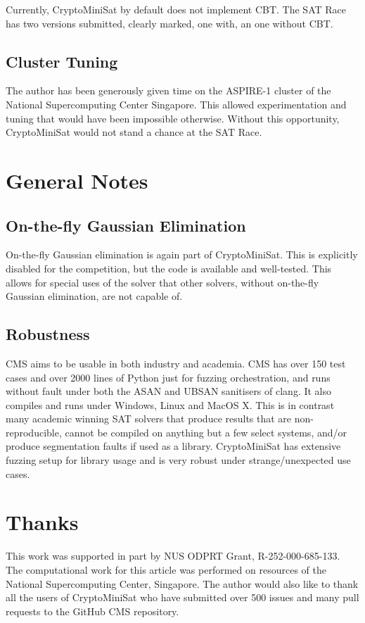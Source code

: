 \documentclass[final]{ieee}
\begin{document}
Currently, CryptoMiniSat by default does not implement CBT. The SAT Race has two versions submitted, clearly marked, one with, an one without CBT.

\subsection{Cluster Tuning}
The author has been generously given time on the ASPIRE-1 cluster of the National Supercomputing Center Singapore\cite{nscc}. This allowed experimentation and tuning that would have been impossible otherwise. Without this opportunity, CryptoMiniSat would not stand a chance at the SAT Race.

\section{General Notes}
\subsection{On-the-fly Gaussian Elimination}
On-the-fly Gaussian elimination is again part of CryptoMiniSat. This is explicitly disabled for the competition, but the code is available and well-tested. This allows for special uses of the solver that other solvers, without on-the-fly Gaussian elimination, are not capable of.

\subsection{Robustness}
CMS aims to be usable in both industry and academia. CMS has over 150 test cases and over 2000 lines of Python just for fuzzing orchestration, and runs without fault under both the ASAN and UBSAN sanitisers of clang. It also compiles and runs under Windows, Linux and MacOS X. This is in contrast many academic winning SAT solvers that produce results that are non-reproducible, cannot be compiled on anything but a few select systems, and/or produce segmentation faults if used as a library. CryptoMiniSat has extensive fuzzing setup for library usage and is very robust under strange/unexpected use cases.

\section{Thanks}
This work was supported in part by NUS ODPRT Grant, R-252-000-685-133. The computational work for this article was performed on resources of the National Supercomputing Center, Singapore\cite{nscc}. The author would also like to thank all the users of CryptoMiniSat who have submitted over 500 issues and many pull requests to the GitHub CMS repository\cite{CMS}.




\vfill
\pagebreak
\end{document}
